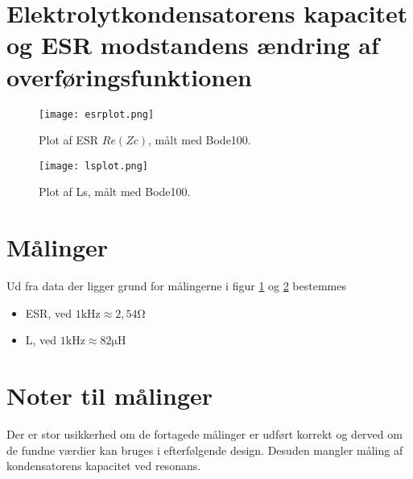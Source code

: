 \section{Elektrolytkondensatorens kapacitet og ESR modstandens ændring af overføringsfunktionen}\label{sec:spm4}

\begin{figure}[h!]
	\centering
	\texttt{[image: esrplot.png]}
	\caption{Plot af ESR $Re(Zc)$, målt med Bode100.}
	\label{fig:esrplot}
\end{figure}
\FloatBlock

\begin{figure}[h!]
	\centering
	\texttt{[image: lsplot.png]}
	\caption{Plot af Ls, målt med Bode100.}
	\label{fig:lsplot}
\end{figure}
\FloatBlock
\section*{Målinger}
Ud fra data der ligger grund for målingerne i figur \ref{fig:esrplot} og \ref{fig:lsplot} bestemmes
\begin{itemize}
	\item ESR, ved $1 \si{\kilo\hertz} \approx 2,54 \si{\ohm}$
	\item L, ved $1 \si{\kilo\hertz} \approx 82 \si{\micro\henry}$
\end{itemize} 

\section*{Noter til målinger}
Der er stor usikkerhed om de fortagede målinger er udført korrekt og derved om de fundne værdier kan bruges i efterfølgende design.
Desuden mangler måling af kondensatorens kapacitet ved resonans.